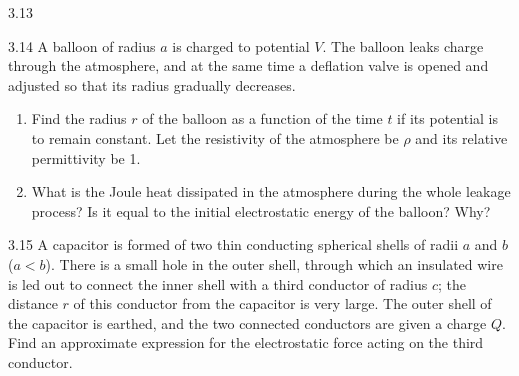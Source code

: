 \begin{figbox}{3.13}
\end{figbox}

\begin{problem}{3.14}
A balloon of radius $a$ is charged to potential $V$. The balloon leaks charge through the atmosphere, and at the same time a deflation valve is opened and adjusted so that its radius gradually decreases.
\begin{enumerate}[label=(\arabic*),leftmargin=2.2em,itemsep=1pt,topsep=2pt]
\item Find the radius $r$ of the balloon as a function of the time $t$ if its potential is to remain constant. Let the resistivity of the atmosphere be $\rho$ and its relative permittivity be 1.
\item What is the Joule heat dissipated in the atmosphere during the whole leakage process? Is it equal to the initial electrostatic energy of the balloon? Why?
\end{enumerate}
\end{problem}

\begin{problem}{3.15}
A capacitor is formed of two thin conducting spherical shells of radii $a$ and $b$ ($a<b$). There is a small hole in the outer shell, through which an insulated wire is led out to connect the inner shell with a third conductor of radius $c$; the distance $r$ of this conductor from the capacitor is very large. The outer shell of the capacitor is earthed, and the two connected conductors are given a charge $Q$. Find an approximate expression for the electrostatic force acting on the third conductor.
\end{problem}


